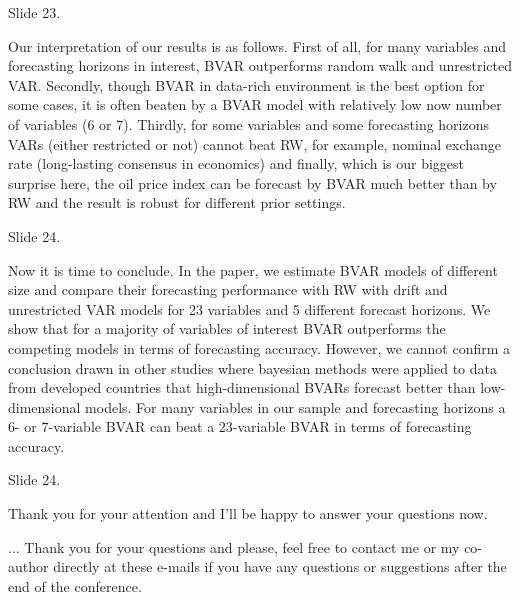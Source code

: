\documentclass[12pt,a4paper,english,fleqn,oneside,openany]{article}
\begin{document}
 Slide 23.
 
  
Our interpretation of our results is as follows. First of all, for many variables and forecasting horizons in interest, BVAR outperforms random walk and unrestricted VAR. Secondly, though BVAR in data-rich environment is the best option for some cases, it is often beaten by a BVAR model with relatively low now number of variables (6 or 7). Thirdly, for some variables and some forecasting horizons VARs (either restricted or not) cannot beat RW, for example, nominal exchange rate (long-lasting consensus in economics) and finally, which is our biggest surprise here,  the oil price index can be forecast by BVAR much better than by RW and the result is robust for different prior settings.

Slide 24.

Now it is time to conclude. In the paper, we estimate BVAR models of different size and compare their forecasting performance with RW with drift and unrestricted VAR models for 23 variables and 5 different forecast horizons. We show that for a majority of variables of interest BVAR  outperforms the competing models in terms of forecasting accuracy. However, we cannot confirm a conclusion drawn in other studies where bayesian methods were applied to data from developed countries that high-dimensional BVARs forecast better than low-dimensional models. For many variables in our sample and forecasting horizons a 6- or 7-variable BVAR can beat a 23-variable BVAR in terms of forecasting accuracy.

Slide 24.

Thank you for your attention and I'll be happy to answer your questions now. 

... Thank you for your questions and please, feel free to contact me or my co-author directly at these e-mails if you have any questions or suggestions after the end of the conference. 
 
\end{document}
